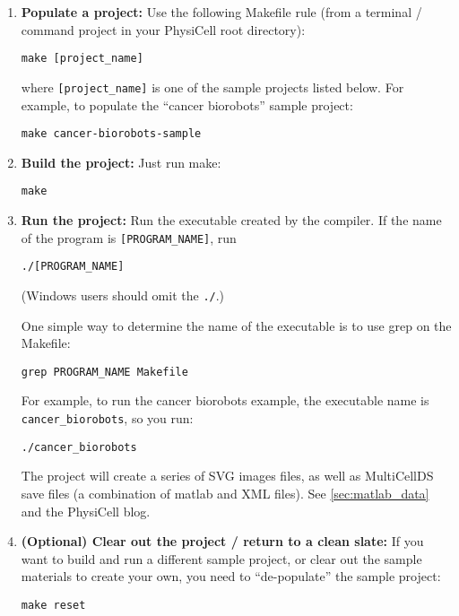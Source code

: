 \documentclass[12pt]{article}
\renewcommand{\v}{\verb}
\begin{document}
\begin{enumerate}
\item 
\textbf{Populate a project:} Use the following Makefile rule (from a terminal / command 
project in your PhysiCell root directory): 

\v|make [project_name]|

where \v|[project_name]| is one of the sample projects listed below. For example, to 
populate the ``cancer biorobots'' sample project: 

\v|make cancer-biorobots-sample|

\item 
\textbf{Build the project:} Just run make:

\v|make|

\item 
\textbf{Run the project:} Run the executable created by the compiler. If the name 
of the program is \v|[PROGRAM_NAME]|, run 

\v|./[PROGRAM_NAME]|

(Windows users should omit the \v|./|.) 

One simple way to determine the name of the executable is to use grep on the Makefile: 

\v|grep PROGRAM_NAME Makefile| 

For example, to run the cancer biorobots example, the executable name is 
\v|cancer_biorobots|, so you run: 

\v|./cancer_biorobots|

The project will create a series of SVG images files, as well as MultiCellDS save files 
(a combination of matlab and XML files). See \ref{sec:matlab_data} and 
the PhysiCell blog.

\item 
\textbf{(Optional) Clear out the project / return to a clean slate:} If you want 
to build and run a different sample project, or clear out the sample materials 
to create your own, you need to ``de-populate'' the sample project: 

\v|make reset|

\end{enumerate}
\end{document}
